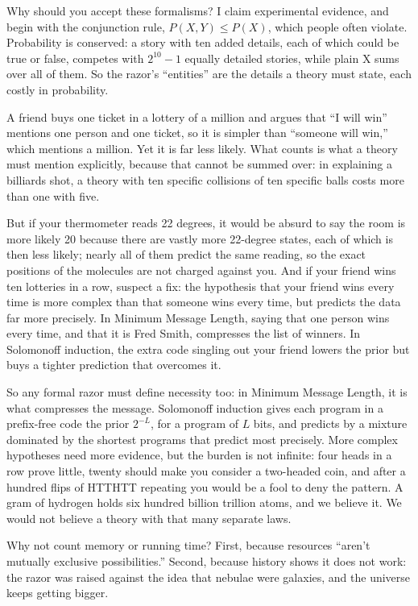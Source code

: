 Why should you accept these formalisms? I claim experimental evidence, and begin with the conjunction rule, $P(X,Y) \le P(X)$, which people often violate. Probability is conserved: a story with ten added details, each of which could be true or false, competes with $2^{10}-1$ equally detailed stories, while plain X sums over all of them. So the razor's ``entities'' are the details a theory must state, each costly in probability.

A friend buys one ticket in a lottery of a million and argues that ``I will win'' mentions one person and one ticket, so it is simpler than ``someone will win,'' which mentions a million. Yet it is far less likely. What counts is what a theory must mention explicitly, because that cannot be summed over: in explaining a billiards shot, a theory with ten specific collisions of ten specific balls costs more than one with five.

But if your thermometer reads 22 degrees, it would be absurd to say the room is more likely 20 because there are vastly more 22-degree states, each of which is then less likely; nearly all of them predict the same reading, so the exact positions of the molecules are not charged against you. And if your friend wins ten lotteries in a row, suspect a fix: the hypothesis that your friend wins every time is more complex than that someone wins every time, but predicts the data far more precisely. In Minimum Message Length, saying that one person wins every time, and that it is Fred Smith, compresses the list of winners. In Solomonoff induction, the extra code singling out your friend lowers the prior but buys a tighter prediction that overcomes it.

So any formal razor must define necessity too: in Minimum Message Length, it is what compresses the message. Solomonoff induction gives each program in a prefix-free code the prior $2^{-L}$, for a program of $L$ bits, and predicts by a mixture dominated by the shortest programs that predict most precisely. More complex hypotheses need more evidence, but the burden is not infinite: four heads in a row prove little, twenty should make you consider a two-headed coin, and after a hundred flips of HTTHTT repeating you would be a fool to deny the pattern. A gram of hydrogen holds six hundred billion trillion atoms, and we believe it. We would not believe a theory with that many separate laws.

Why not count memory or running time? First, because resources ``aren't mutually exclusive possibilities.''  Second, because history shows it does not work: the razor was raised against the idea that nebulae were galaxies, and the universe keeps getting bigger. 

